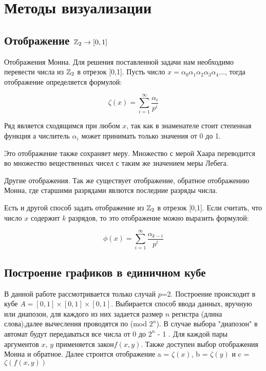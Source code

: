 \chapter{Методы визуализации} \label{chapt2}
\section{Отображение $\mathbb{Z}_2 \rightarrow [0,1]$} \label{sect2_1}

Отображения Монна. Для решения поставленной задачи нам необходимо перевести числа из $\mathbb{Z}_2$ в отрезок [0,1]. Пусть число $x=\alpha_0\alpha_1\alpha_2\alpha_3\alpha_4\ldots$, тогда отображение определяется формулой:

\begin{equation}
    \zeta(x)=\sum_{i=1}^\infty \frac{\alpha_i}{p^i}
\end{equation}

Ряд является сходящимся при любом $x$, так как в знаменателе стоит степенная функция а числитель $\alpha_i$ может принимать только значения от 0 до 1.


Это отображение также сохраняет меру. Множество с мерой Хаара переводится во множество вещественных чисел с таким же значением меры Лебега. 
\vspace{5mm}

Другие отображения. Так же существует отображение, обратное отображению Монна, где старшими разрядами явлются последние разряды числа.

Есть и другой способ задать отображение  из $\mathbb{Z}_2$ в отрезок [0,1]. Если считать, что число $x$ содержит $k$ разрядов, то это отображение можно выразить формулой: 

\begin{equation}
    \phi(x)=\sum_{i=1}^\infty \frac{\alpha_{k-i}}{p^i}
\end{equation}



\section{Построение графиков в единичном кубе} \label{sect2_2}

В данной работе рассмотривается только случай $p$=2. Построение происходит в кубе $A=[0,1]\times[0,1]\times[0,1]$. Выбирается способ ввода данных, вручную или диапозон, для каждого из них задается размер $n$ регистра (длина слова),далее вычесления проводятся по (mod $2^n$). В случае выбора "диапозон" в автомат будут передаваться все числа от 0 до $2^n$ - 1 . Для каждой пары аргументов $x$, $y$ применяется закон$f(x, y)$. Также доступен выбор отображения Монна и обратное. Далее строится отображение a = $\zeta(x)$, b = $\zeta(y)$ и c = $\zeta(f(x,y))$

